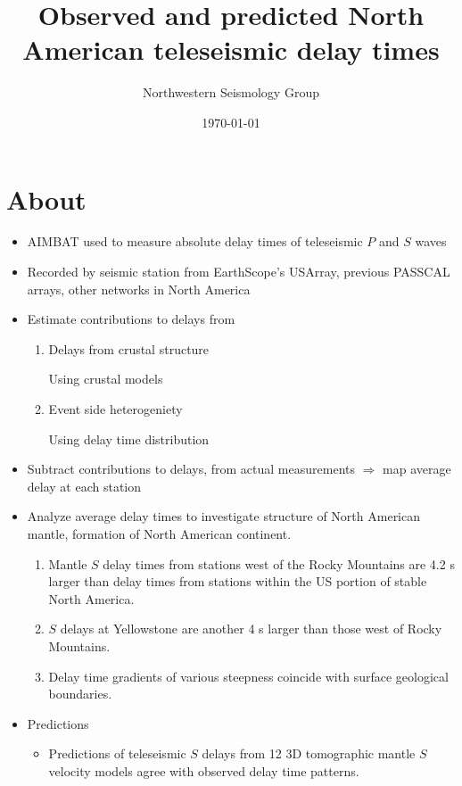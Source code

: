 \documentclass[letterpaper,10pt]{article}
\title{Observed and predicted North American teleseismic delay times}
\author{Northwestern Seismology Group}
\date{\today}
\begin{document}
\maketitle


\section{About}

\begin{itemize}
  \item AIMBAT used to measure absolute delay times of teleseismic $P$ and $S$ waves 
  \item Recorded by seismic station from EarthScope's USArray, previous PASSCAL arrays, other networks in North America
  \item Estimate contributions to delays from
        \begin{enumerate}
          \item Delays from crustal structure

                Using crustal models
          \item Event side heterogeniety

                Using delay time distribution
        \end{enumerate}
  \item Subtract contributions to delays, from actual measurements $\Rightarrow$ map average delay at each station 
  \item Analyze average delay times to investigate structure of North American mantle, formation of North American continent. 
        \begin{enumerate}
          \item Mantle $S$ delay times from stations west of the Rocky Mountains are 4.2 s larger than delay times from stations within the US portion of stable North America.
          \item $S$ delays at Yellowstone are another 4 s larger than those west of Rocky Mountains. 
          \item Delay time gradients of various steepness coincide with surface geological boundaries. 
        \end{enumerate}
  \item Predictions
        \begin{itemize}
          \item Predictions of teleseismic $S$ delays from 12 3D tomographic mantle $S$ velocity models agree with observed delay time patterns.


\end{itemize}
\end{itemize}
\end{document}
